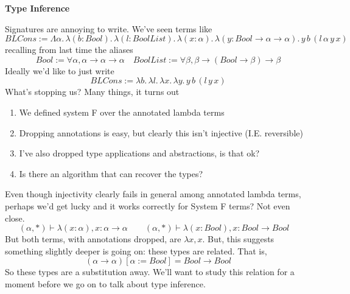 \documentclass[12pt]{article}
\begin{document}
\baselineskip 12pt

\begin{center}
\textbf{\Large Type Inference} \\
\end{center}

Signatures are annoying to write. 
We've seen terms like 
\[
  BLCons := \Lambda \alpha.\, \lambda (b : Bool).\, \lambda (l : BoolList).\, \lambda (x:\alpha).\,\lambda(y:Bool \rightarrow \alpha \rightarrow \alpha).\, y\, b\, (l\, \alpha \, y\, x)
\]
recalling from last time the aliases 
\[
    Bool := \forall \alpha, \alpha \rightarrow \alpha \rightarrow \alpha\quad
    BoolList := \forall \beta, \beta \rightarrow (Bool \rightarrow \beta) \rightarrow \beta
\]
Ideally we'd like to just write
\[
  BLCons := \lambda b.\, \lambda l.\, \lambda x.\,\lambda y.\, y\, b\, (l\, y\, x)
\]
What's stopping us? Many things, it turns out
\begin{enumerate}
    \item We defined system F over the annotated lambda terms
    \item Dropping annotations is easy, but clearly this isn't injective (I.E. reversible)
    \item I've also dropped type applications and abstractions, is that ok?
    \item Is there an algorithm that can recover the types?
\end{enumerate}
Even though injectivity clearly fails in general among annotated lambda terms, perhaps we'd get lucky and it works correctly for System F terms? 
Not even close.
\[
  (\alpha,*) \vdash \lambda (x : \alpha), x : \alpha \rightarrow \alpha\quad\quad
  (\alpha,*) \vdash \lambda (x : Bool), x : Bool \rightarrow Bool\quad
\]
But both terms, with annotations dropped, are $\lambda x, x$.
But, this suggests something slightly deeper is going on: these types are related.
That is, 
\[
(\alpha \rightarrow \alpha)[\alpha := Bool] = Bool \rightarrow Bool
\]
So these types are a substitution away.
We'll want to study this relation for a moment before we go on to talk about type inference.
\end{document}
